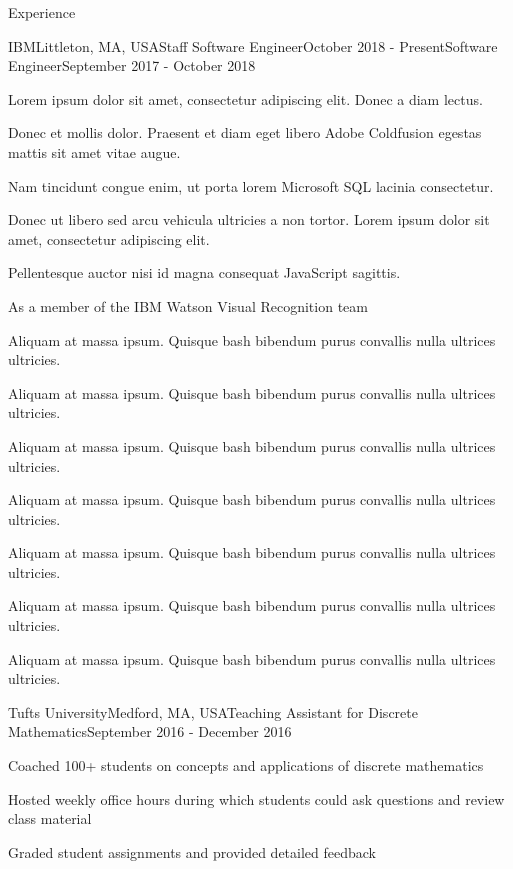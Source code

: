 \documentclass{resume}
\begin{document}
  \begin{rSection}{Experience}
    \begin{rSubsection}{IBM}{Littleton, MA, USA}{Staff Software Engineer}{October 2018 - Present}{Software Engineer}{September 2017 - October 2018}
    \item Lorem ipsum dolor sit amet, consectetur adipiscing elit. Donec a diam lectus.
    \item Donec et mollis dolor. Praesent et diam eget libero Adobe Coldfusion egestas mattis sit amet vitae augue.
    \item Nam tincidunt congue enim, ut porta lorem Microsoft SQL lacinia consectetur.
    \item Donec ut libero sed arcu vehicula ultricies a non tortor. Lorem ipsum dolor sit amet, consectetur adipiscing elit.
    \item Pellentesque auctor nisi id magna consequat JavaScript sagittis.
    \item As a member of the IBM Watson Visual Recognition team
    \item Aliquam at massa ipsum. Quisque bash bibendum purus convallis nulla ultrices ultricies.
    \item Aliquam at massa ipsum. Quisque bash bibendum purus convallis nulla ultrices ultricies.
    \item Aliquam at massa ipsum. Quisque bash bibendum purus convallis nulla ultrices ultricies.
    \item Aliquam at massa ipsum. Quisque bash bibendum purus convallis nulla ultrices ultricies.
    \item Aliquam at massa ipsum. Quisque bash bibendum purus convallis nulla ultrices ultricies.
    \item Aliquam at massa ipsum. Quisque bash bibendum purus convallis nulla ultrices ultricies.
    \item Aliquam at massa ipsum. Quisque bash bibendum purus convallis nulla ultrices ultricies.
    \end{rSubsection}
    
    \begin{rSubsection}{Tufts University}{Medford, MA, USA}{Teaching Assistant for Discrete Mathematics}{September 2016 - December 2016}{}{}
    \item Coached 100+ students on concepts and applications of discrete mathematics
    \item Hosted weekly office hours during which students could ask questions and review class material
    \item Graded student assignments and provided detailed feedback
    \end{rSubsection}
    

\end{rSection}
\end{document}
